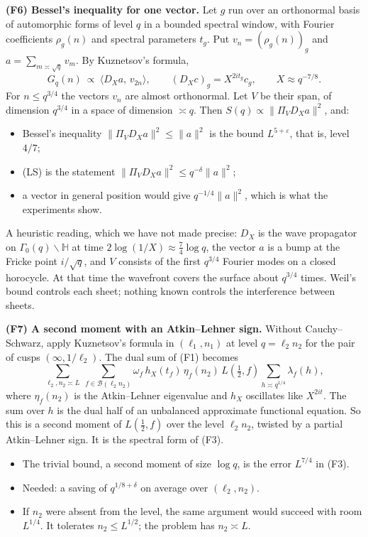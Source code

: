 \documentclass[11pt]{amsart}
\theoremstyle{definition}
\theoremstyle{remark}
\numberwithin{equation}{section}
\newcommand{\eps}{\varepsilon}
\begin{document}
\medskip
\noindent\textbf{(F6) Bessel's inequality for one vector.}  Let $g$ run over
an orthonormal basis of automorphic forms of level $q$ in a bounded spectral
window, with Fourier coefficients $\rho_g(n)$ and spectral parameters $t_g$.
Put $v_n=(\rho_g(n))_g$ and $a=\sum_{m\asymp\sqrt q}v_m$.  By Kuznetsov's
formula,
\[
 G_q(n)\ \propto\ \langle D_Xa,\,v_{2n}\rangle,\qquad
 (D_Xc)_g=X^{2it_g}c_g,\qquad X\approx q^{-7/8}.
\]
For $n\le q^{3/4}$ the vectors $v_n$ are almost orthonormal.  Let $V$ be
their span, of dimension $q^{3/4}$ in a space of dimension $\asymp q$.  Then
$S(q)\propto\|\Pi_VD_Xa\|^2$, and:
\begin{itemize}
\item Bessel's inequality $\|\Pi_VD_Xa\|^2\le\|a\|^2$ is the bound
$L^{5+\eps}$, that is, level $4/7$;
\item (LS) is the statement $\|\Pi_VD_Xa\|^2\le q^{-\delta}\|a\|^2$;
\item a vector in general position would give $q^{-1/4}\|a\|^2$, which is
what the experiments show.
\end{itemize}
A heuristic reading, which we have not made precise: $D_X$ is the wave
propagator on $\Gamma_0(q)\backslash\mathbb H$ at time $2\log(1/X)\approx
\tfrac74\log q$, the vector $a$ is a bump at the Fricke point $i/\sqrt q$,
and $V$ consists of the first $q^{3/4}$ Fourier modes on a closed horocycle.
At that time the wavefront covers the surface about $q^{3/4}$ times.
Weil's bound controls each sheet; nothing known controls the interference
between sheets.

\medskip
\noindent\textbf{(F7) A second moment with an Atkin--Lehner sign.}  Without
Cauchy--Schwarz, apply Kuznetsov's formula in $(\ell_1,n_1)$ at level
$q=\ell_2n_2$ for the pair of cusps $(\infty,1/\ell_2)$.  The dual sum of
(F1) becomes
\[
 \sum_{\ell_2,n_2\asymp L}\ \sum_{f\in\mathcal B(\ell_2n_2)}
 \omega_f\,h_X(t_f)\,\eta_f(n_2)\,L(\tfrac12,f)
 \sum_{h\asymp q^{1/4}}\lambda_f(h),
\]
where $\eta_f(n_2)$ is the Atkin--Lehner eigenvalue and $h_X$ oscillates
like $X^{2it}$.  The sum over $h$ is the dual half of an unbalanced
approximate functional equation.  So this is a second moment of
$L(\frac12,f)$ over the level $\ell_2n_2$, twisted by a partial
Atkin--Lehner sign.  It is the spectral form of (F3).
\begin{itemize}
\item The trivial bound, a second moment of size $\log q$, is the error
$L^{7/4}$ in (F3).
\item Needed: a saving of $q^{1/8+\delta}$ on average over
$(\ell_2,n_2)$.
\item If $n_2$ were absent from the level, the same argument would succeed
with room $L^{1/4}$.  It tolerates $n_2\le L^{1/2}$; the problem has
$n_2\asymp L$.
\end{itemize}
\end{document}
